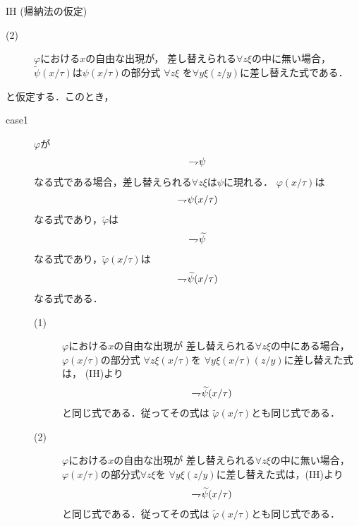 \begin{metaprf}
\begin{description}
\begin{itembox}[l]{IH (帰納法の仮定)}
\begin{description}
						\item[(2)] $\varphi$における$x$の自由な出現が，
							差し替えられる$\forall z \xi$の中に無い場合，
							$\widetilde{\psi}(x/\tau)$は$\psi(x/\tau)$の部分式
							$\forall z \xi$ を$\forall y \xi(z/y)$に差し替えた式である．
					\end{description}
				\end{itembox}
				と仮定する．このとき，
				\begin{description}
					\item[case1] $\varphi$が
						\begin{align}
							\rightharpoondown\hspace{-0.25em} \psi
						\end{align}
						なる式である場合，差し替えられる$\forall z \xi$は$\psi$に現れる．
						$\varphi(x/\tau)$は
						\begin{align}
							\rightharpoondown\hspace{-0.25em} \psi(x/\tau)
						\end{align}
						なる式であり，$\widetilde{\varphi}$は
						\begin{align}
							\rightharpoondown\hspace{-0.25em} \widetilde{\psi}
						\end{align}
						なる式であり，$\widetilde{\varphi}(x/\tau)$は
						\begin{align}
							\rightharpoondown\hspace{-0.25em} \widetilde{\psi}(x/\tau)
						\end{align}
						なる式である．
						\begin{description}
							\item[(1)] $\varphi$における$x$の自由な出現が
								差し替えられる$\forall z \xi$の中にある場合，
								$\varphi(x/\tau)$の部分式
								$\forall z \xi(x/\tau)$を
								$\forall y \xi(x/\tau)(z/y)$に差し替えた式は，
								(IH)より
								\begin{align}
									\rightharpoondown\hspace{-0.25em} \widetilde{\psi}(x/\tau)
								\end{align}
								と同じ式である．従ってその式は
								$\widetilde{\varphi}(x/\tau)$とも同じ式である．
								
							\item[(2)] $\varphi$における$x$の自由な出現が
								差し替えられる$\forall z \xi$の中に無い場合，
								$\varphi(x/\tau)$の部分式$\forall z \xi$を
								$\forall y \xi(z/y)$に差し替えた式は，(IH)より
								\begin{align}
									\rightharpoondown\hspace{-0.25em} \widetilde{\psi}(x/\tau)
								\end{align}
								と同じ式である．従ってその式は
								$\widetilde{\varphi}(x/\tau)$とも同じ式である．
						\end{description}
						

\end{description}
\end{description}
\end{metaprf}
